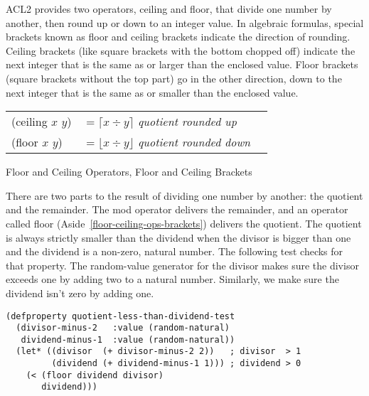 \begin{aside}
ACL2 provides two operators,
\textsf{ceiling} and \textsf{floor}, that divide one number by another,
then round up or down to an integer value.
In algebraic formulas, special brackets known as
floor and ceiling brackets indicate the direction of rounding.
Ceiling brackets (like square brackets with the bottom chopped off)
indicate the next integer that is the same as or larger than
the enclosed value.
Floor brackets (square brackets without the top part)
go in the other direction, down to the next integer
that is the same as or smaller than the enclosed value.
\\
\begin{center}
\begin{tabular}{lll}
\textsf{(ceiling $x$ $y$)}& $= \lceil x  \div y \rceil $ \emph{quotient rounded up}   \\
\textsf{(floor $x$ $y$)}  & $= \lfloor x \div y \rfloor$ \emph{quotient rounded down} \\
\end{tabular}
\end{center}
\caption{Floor and Ceiling Operators, Floor and Ceiling Brackets}
\label{floor-def}
\label{ceiling-def}
\label{floor-ceiling-ops-brackets}
\end{aside}

There are two parts to the result
of dividing one number by another: the quotient and the remainder.
The \textsf{mod} operator delivers the remainder,
and an operator called \textsf{floor} (Aside~\ref{floor-ceiling-ops-brackets})
delivers the quotient.
The quotient is always strictly smaller
than the dividend when the divisor is bigger than one
and the dividend is a non-zero, natural number.
The following test checks for that property.
The random-value generator for the divisor
makes sure the divisor exceeds one by adding two
to a natural number.
Similarly, we make sure the dividend isn't zero by adding one.

\label{quotient-less-than-dividend-test}
\begin{Verbatim}
(defproperty quotient-less-than-dividend-test
  (divisor-minus-2   :value (random-natural)
   dividend-minus-1  :value (random-natural))
  (let* ((divisor  (+ divisor-minus-2 2))   ; divisor  > 1
         (dividend (+ dividend-minus-1 1))) ; dividend > 0
    (< (floor dividend divisor)
       dividend)))
\end{Verbatim}

